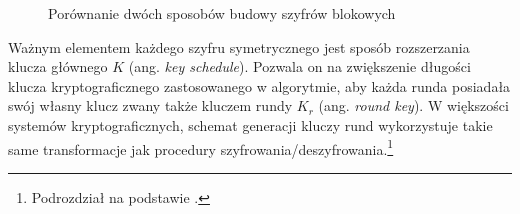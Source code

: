 \begin{figure}[H]
  \centering
  \hfill
  \caption{Porównanie dwóch sposobów budowy szyfrów blokowych}
  \label{fig:siec_feistela_sp}
\end{figure}

Ważnym elementem każdego szyfru symetrycznego jest sposób rozszerzania klucza głównego $K$ (ang. \textit{key schedule}). Pozwala on na zwiększenie długości klucza kryptograficznego zastosowanego w algorytmie, aby każda runda posiadała swój własny klucz zwany także kluczem rundy $K_r$ (ang. \textit{round key}). W większości systemów kryptograficznych, schemat generacji kluczy rund wykorzystuje takie same transformacje jak procedury szyfrowania/deszyfrowania.\footnote{Podrozdział na podstawie \cite{kryptografia_stosowana}.}

